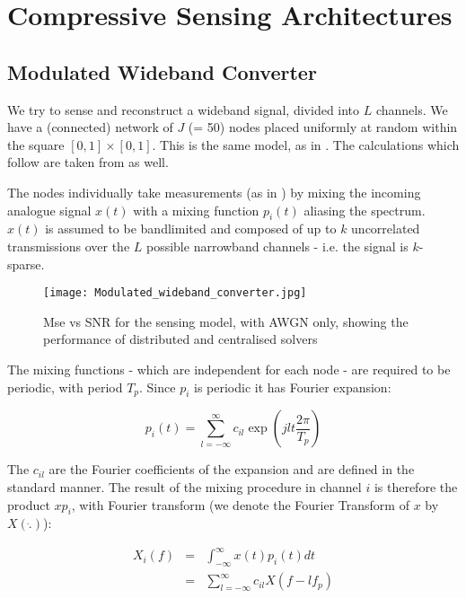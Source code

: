 \section{Compressive Sensing Architectures}\label{sec:sensingmodel}

\subsection{Modulated Wideband Converter}
We try to sense and reconstruct a wideband signal, divided into \(L\) channels. We have a (connected) network of \(J\) (= 50) nodes placed uniformly at random within the square \(  \left[0,1\right]\times \left[0,1\right] \). This is the same model, as in \cite{Zhang2011b}. The calculations which follow are taken from \cite{Zhang2011b} as well.

The nodes individually take measurements (as in \cite{mishali2010theory}) by mixing the incoming analogue signal \(x\left(t\right)\) with a mixing function \(p_i\left(t\right)\) aliasing the spectrum. \(x\left(t\right)\) is assumed to be bandlimited and composed of up to \(k\) uncorrelated transmissions over the \(L\) possible narrowband channels - i.e. the signal is \(k\)-sparse. 

\begin{figure}[h]
\centering
\texttt{[image: Modulated\_wideband\_converter.jpg]}
\caption{Mse vs SNR for the sensing model, with AWGN only, showing the performance of distributed and centralised solvers}
\label{msevssnr0}
\end{figure}

The mixing functions - which are independent for each node - are required to be periodic, with period \(T_p\). Since \(p_i\) is periodic it has Fourier expansion:

\begin{equation}
p_i\left(t\right) = \sum_{l=-\infty}^{\infty} c_{il} \exp\left({jlt\frac{2\pi}{T_p}}\right)
\end{equation}

The \(c_{il}\) are the Fourier coefficients of the expansion and are defined in the standard manner. The result of the mixing procedure in channel \(i\) is therefore the product \(xp_i\), with Fourier transform (we denote the Fourier Transform of \(x\) by \(X\left( \dot{.} \right)\)):

\begin{align}
X_{i}\left(f\right) &=& \int_{-\infty}^{\infty} x\left(t\right) p_i\left(t\right) dt \nonumber
\\ &=& \sum_{l=-\infty}^{\infty} c_{il} X\left(f-lf_p\right)
\end{align}

